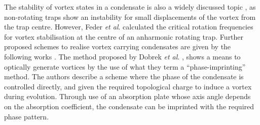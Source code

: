 
The stability of vortex states in a condensate is also a widely discussed topic \cite{Vtx:Fedichev_pra_1999,Vtx:Feder_prl_1999}, as non-rotating traps show an instability for small displacements of the vortex from the trap centre. However, Feder \textit{et al}. \cite{Vtx:Feder_prl_1999} calculated the critical rotation frequencies for vortex stabilisation at the centre of an anharmonic rotating trap. Further proposed schemes to realise vortex carrying condensates are given by the following works \cite{Vtx:Anglin_prl_1999,Vtx:Davies_prl_1999,Vtx:Marshall_pra_1999,Vtx:Dobrek_pra_1999}. The method proposed by Dobrek \textit{et al}. \cite{Vtx:Dobrek_pra_1999}, shows a means to optically generate vortices by the use of what they term a ``phase-imprinting'' method. The authors describe a scheme where
the phase of the condensate is controlled directly, and given the required topological charge to induce a vortex during evolution. Through use of an absorption plate whose axis angle depends on the absorption coefficient, the condensate can be imprinted with the required phase pattern.

